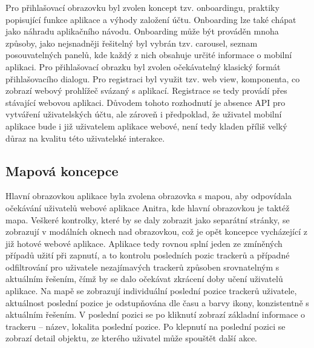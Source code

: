 Pro přihlašovací obrazovku byl zvolen koncept tzv. onboardingu, praktiky popisující funkce aplikace a výhody založení účtu. Onboarding lze také chápat jako náhradu aplikačního návodu. Onboarding může být prováděn mnoha způsoby, jako nejsnadněji řešitelný byl vybrán tzv. carousel, seznam posouvatelných panelů, kde každý z nich obsahuje určité informace o mobilní aplikaci. Pro přihlašovací obrazku byl zvolen očekávatelný klasický formát přihlašovacího dialogu. Pro registraci byl využit tzv. web view, komponenta, co zobrazí webový prohlížeč svázaný s aplikací. Registrace se tedy provádí přes stávající webovou aplikaci. Důvodem tohoto rozhodnutí je absence API pro vytváření uživatelských účtu, ale zároveň i předpoklad, že uživatel mobilní aplikace bude i již uživatelem aplikace webové, není tedy kladen příliš velký důraz na kvalitu této uživatelské interakce.

\subsection{Mapová koncepce}

Hlavní obrazovkou aplikace byla zvolena obrazovka s mapou, aby odpovídala očekávání uživatelů webové aplikace Anitra, kde hlavní obrazovkou je taktéž mapa. Veškeré kontrolky, které by se daly zobrazit jako separátní stránky, se zobrazují v modálních oknech nad obrazovkou, což je opět koncepce vycházející z již hotové webové aplikace. Aplikace tedy rovnou splní jeden ze zmíněných případů užití při zapnutí, a to kontrolu posledních pozic trackerů a případné odfiltrování pro uživatele nezajímavých trackerů způsoben srovnatelným s aktuálním řešením, čímž by se dalo očekávat zkrácení doby učení uživatelů aplikace. Na mapě se zobrazují individuální poslední pozice trackerů uživatele, aktuálnost poslední pozice je odstupňována dle času a barvy ikony, konzistentně s aktuálním řešením. V poslední pozici se po kliknutí zobrazí základní informace o trackeru -- název, lokalita poslední pozice. Po klepnutí na poslední pozici se zobrazí detail objektu, ze kterého uživatel může spouštět další akce.

